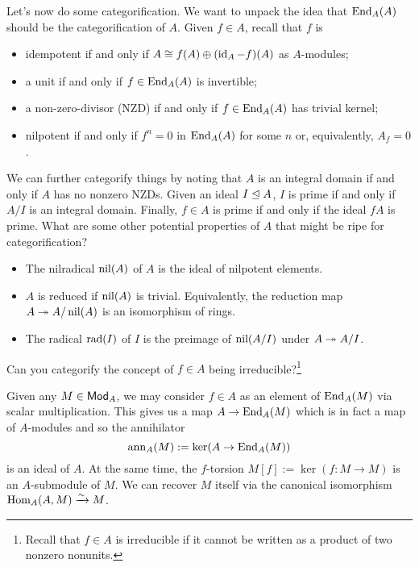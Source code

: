 \documentclass[11pt]{article}
\begin{document}
Let's now do some categorification. We want to unpack the idea that $\operatorname{End}_A(A)$ should be the categorification of $A$. Given $f\in A$, recall that $f$ is
\begin{itemize}
\item idempotent if and only if $A\cong f(A)\oplus(\operatorname{id}_A-f)(A)$ as $A$-modules;

\item a unit if and only if $f\in\operatorname{End}_A(A)$ is invertible;

\item a non-zero-divisor (NZD) if and only if $f\in\operatorname{End}_A(A)$ has trivial kernel;

\item nilpotent if and only if $f^n=0$ in $\operatorname{End}_A(A)$ for some $n$ or, equivalently, $A_f=0$.
\end{itemize}
We can further categorify things by noting that $A$ is an integral domain if and only if $A$ has no nonzero NZDs. Given an ideal $I\trianglelefteq A$, $I$ is prime if and only if $A/I$ is an integral domain. Finally, $f\in A$ is prime if and only if the ideal $fA$ is prime. What are some other potential properties of $A$ that might be ripe for categorification?
\begin{itemize}
\item The nilradical $\operatorname{nil}(A)$ of $A$ is the ideal of nilpotent elements.

\item $A$ is reduced if $\operatorname{nil}(A)$ is trivial. Equivalently, the reduction map $A\twoheadrightarrow A/\operatorname{nil}(A)$ is an isomorphism of rings.

\item The radical $\operatorname{rad}(I)$ of $I$ is the preimage of $\operatorname{nil}(A/I)$ under $A\twoheadrightarrow A/I$.
\end{itemize}

\begin{exercise}
Can you categorify the concept of $f\in A$ being irreducible?\footnote{Recall that $f\in A$ is irreducible if it cannot be written as a product of two nonzero nonunits.}
\end{exercise}

Given any $M\in\operatorname{\mathsf{Mod}}_A$, we may consider $f\in A$ as an element of $\operatorname{End}_A(M)$ via scalar multiplication. This gives us a map $A\to\operatorname{End}_A(M)$ which is in fact a map of $A$-modules and so the annihilator 
$$\operatorname{ann}_A(M):=\ker(A\to\operatorname{End}_A(M))$$ 
is an ideal of $A$. At the same time, the $f$-torsion $M[f]:=\ker(f: M\to M)$ is an $A$-submodule of $M$. We can recover $M$ itself via the canonical isomorphism $\operatorname{Hom}_A(A,M)\xrightarrow{\sim}M$.
\end{document}
